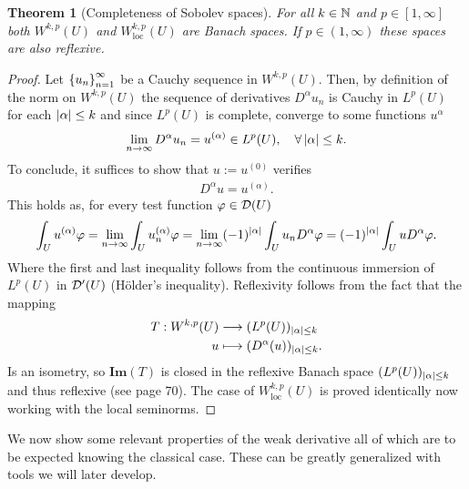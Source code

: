\documentclass[12pt]{article}
\newtheorem{theorem}{Theorem}
\theoremstyle{remark}
\renewcommand{\Im}{\mathbf{Im}}
\begin{document}
\begin{theorem}[Completeness of Sobolev spaces]\label{completeness} For all  $k \in \mathbb{N}$ and $p \in [1,\infty]$ both  $W^{k,p}(U)$ and $W^{k,p}_{\mathrm{loc}}(U)$ are Banach spaces. If $p \in (1,\infty)$ these spaces are also reflexive.
\end{theorem}
\begin{proof}
	Let $\left\{u_n\right\}_{n=1}^\infty  $ be a Cauchy sequence in  $W^{k,p}(U)$. Then, by definition of the norm on $W^{k,p}(U)$ the sequence of derivatives $D^\alpha u_n$ is Cauchy in $L^p(U)$ for  each $\left| \alpha \right|\leq k $ and since $L^p(U)$ is complete, converge to some functions $u^{\alpha}$
	\begin{align*}
		\lim_{n \to \infty} D^\alpha u_n = u^{(\alpha)} \in L^p(U) , \quad\forall \left| \alpha \right| \leq k  .
	\end{align*}
	To conclude, it suffices to show that  $u:= u^{(0)}$ verifies
	\begin{align*}
		D^\alpha u= u^{(\alpha)}.
	\end{align*}
	This holds as, for every test function $\varphi \in  \mathcal{D}(U)$
	\begin{align*}
		\int_{U} u^{(\alpha)}\varphi =\lim_{n \to \infty}\int_{U} u_n^{(\alpha)}\varphi=\lim_{n \to \infty}(-1)^{\left| \alpha \right| }\int_{U} u_nD^\alpha\varphi=(-1)^{\left| \alpha \right| }\int_{U} uD^\alpha\varphi  .
	\end{align*}
	Where the first and last inequality follows from the continuous immersion of $L^p(U)$ in $\mathcal{D}'(U)$ (Hölder's inequality). Reflexivity follows from the fact that the mapping
	\begin{align*}
		T: W^{k,p}(U) & \longrightarrow (L^p(U))_{\left| \alpha \right|\leq k }
		\\
		u             & \longmapsto     (D^{\alpha}(u))_{\left| \alpha \right|\leq k }
		.\end{align*}
	Is an isometry, so $\Im(T)$ is closed in the reflexive Banach space $(L^p(U))_{\left| \alpha \right|\leq k }
	$ and thus reflexive (see \cite{brezis2011functional} page 70).
	The case of $W^{k,p}_{\mathrm{loc}}(U)$ is proved identically now working with the local seminorms.
\end{proof}
We now show some relevant properties of the weak derivative all of which are to be expected knowing the classical case. These can be greatly generalized with tools we will later develop.
\end{document}
